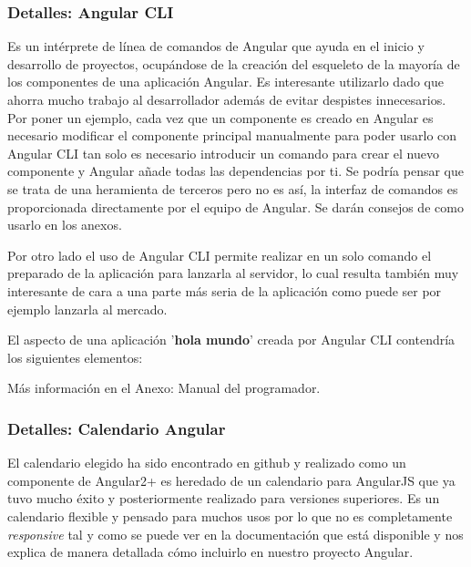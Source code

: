 \subsubsection{Detalles: Angular CLI}\label{detalle_angularcli}
Es un intérprete de línea de comandos de Angular que ayuda en el inicio y desarrollo de proyectos, ocupándose de la creación del esqueleto de la mayoría de los componentes de una aplicación Angular. Es interesante utilizarlo dado que ahorra mucho trabajo al desarrollador además de evitar despistes innecesarios. Por poner un ejemplo, cada vez que un componente es creado en Angular es necesario modificar el componente principal manualmente para poder usarlo con Angular CLI tan solo es necesario introducir un comando para crear el nuevo componente y Angular añade todas las dependencias por ti. Se podría pensar que se trata de una heramienta de terceros pero no es así, la interfaz de comandos es proporcionada directamente por el equipo de Angular. Se darán consejos de como usarlo en los anexos.

Por otro lado el uso de Angular CLI permite realizar en un solo comando el preparado de la aplicación para lanzarla al servidor, lo cual resulta también muy interesante de cara a una parte más seria de la aplicación como puede ser por ejemplo lanzarla al mercado.

El aspecto de una aplicación '\textbf{hola mundo}' creada por Angular CLI contendría los siguientes elementos:


Más información en el Anexo: Manual del programador. 

\subsubsection{Detalles: Calendario Angular}\label{detalle_calendario}
El calendario elegido ha sido encontrado en github y realizado como un componente de Angular2+ es heredado de un calendario para AngularJS que ya tuvo mucho éxito y posteriormente realizado para versiones superiores. Es un calendario flexible y pensado para muchos usos por lo que no es completamente \emph{responsive} tal y como se puede ver en la documentación \cite{calendariodocs}  que está disponible y nos explica de manera detallada cómo incluirlo en nuestro proyecto Angular.

